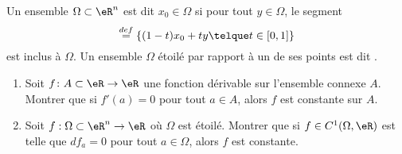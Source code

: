 
\begin{exercice}\label{exoTP20090001}

Un ensemble $\Omega\subset\eR^n$ est dit  $x_0\in\Omega$ si pour tout $y \in \Omega$, le segment
\begin{equation*}
	[x_0, y] \stackrel{def}{=} \{ (1-t) x_0 + t y \telque t \in  [0,1] \}
\end{equation*}
est inclus à $\Omega$. Un ensemble $\Omega$ étoilé par rapport à un de ses points est dit .

\begin{enumerate}
\item
Soit $f\colon A\subset \eR\to\eR$ une fonction dérivable sur l'ensemble connexe $A$. Montrer que si $f'(a)=0$ pour tout $a\in A$, alors $f$ est constante sur $A$.

\item
Soit $f : \Omega \subset \eR^n \to \eR$ où $\Omega$ est étoilé. Montrer que si $f \in C^1(\Omega,{\eR})$ est telle que $df_a = 0$ pour tout $a \in \Omega$, alors $f$ est constante.

\end{enumerate}

\end{exercice}
